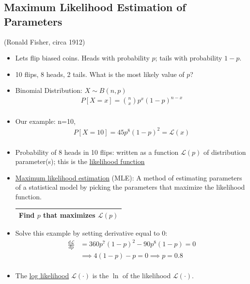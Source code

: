 \documentclass[10pt]{article}
\begin{document}
	\subsection*{Maximum Likelihood Estimation of Parameters} (Ronald Fisher, circa 1912)
		\
		\begin{itemize}
			\item Lets flip biased coins. Heads with probability $p$; tails with probability $1-p$.
			\item 10 flips, 8 heads, 2 tails. What is the most likely value of $p$?
			\item Binomial Distribution: $X \sim B(n, p)$
				\begin{align*}
					P[X=x] = {n \choose x} p^{x}(1-p)^{n-x}\\
				\end{align*}
			\item Our example: n=10,
				\begin{align*}
					P[X=10] = 45 p^{8}(1-p)^{2} = \mathcal{L}(x)\\
				\end{align*}
			\item Probability of 8 heads in 10 flips: written as a function $\mathcal{L}(p)$ of distribution parameter(s); this is the \underline{likelihood function}
			\item \underline{Maximum likelihood estimation} (MLE): A method of estimating parameters of a statistical model by picking the parameters that maximize the likelihood function.
				\begin{center}
					\begin{tabular}{| c |}
						\hline
 					Find $p$ that maximizes $\mathcal{L}(p)$\\
 					\hline
					\end{tabular}
				\end{center}
			\item Solve this example by setting derivative equal to 0:
				\begin{align*}
					\frac{d\mathcal{L}}{dp} &= 360p^{7}(1-p)^{2} - 90p^{8}(1-p) = 0\\
						&\implies 4(1-p)-p = 0 \implies p=0.8\\
				\end{align*}
			\item The \underline{log likelihood} $\mathcal{L}(\cdot)$ is the $\ln$ of the likelihood $\mathcal{L}(\cdot)$.
		\end{itemize}
	
\end{document}

